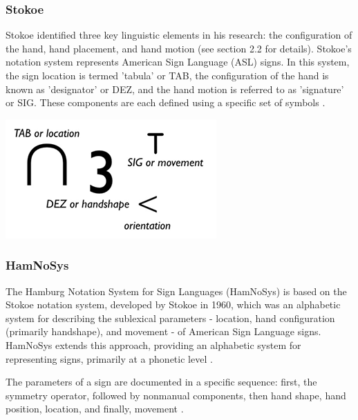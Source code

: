 \subsubsection{Stokoe}

Stokoe identified three key linguistic elements in his research: the configuration of the hand, hand placement, and hand motion (see section 2.2 for details). Stokoe's notation system represents American Sign Language (ASL) signs. In this system, the sign location is termed 'tabula' or TAB, the configuration of the hand is known as 'designator' or DEZ, and the hand motion is referred to as 'signature' or SIG. These components are each defined using a specific set of symbols \parencite{stokoe2005sign}.

\includegraphics[width=\textwidth]{figures/stokoe-notation.PNG}

\subsubsection{HamNoSys}

The Hamburg Notation System for Sign Languages (HamNoSys) is based on the Stokoe notation system, developed by Stokoe in 1960, which was an alphabetic system for describing the sublexical parameters - location, hand configuration (primarily handshape), and movement - of American Sign Language signs. HamNoSys extends this approach, providing an alphabetic system for representing signs, primarily at a phonetic level \parencite{prillwitz1989hamnosys}. 

The parameters of a sign are documented in a specific sequence: first, the symmetry operator, followed by nonmanual components, then hand shape, hand position, location, and finally, movement \parencite{kaur2014hamnosys}.




